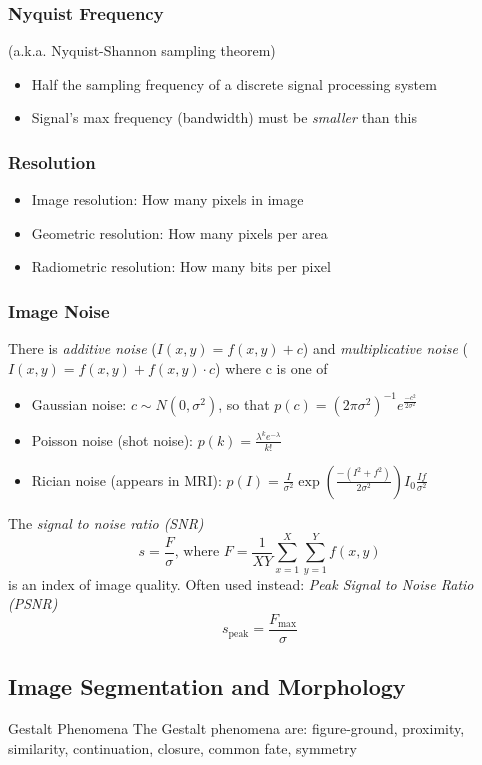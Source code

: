 \documentclass[a4paper,10pt]{article}
\begin{document}
\subsubsection{Nyquist Frequency}
(a.k.a. Nyquist-Shannon sampling theorem)
\begin{itemize}
    \item Half the sampling frequency of a discrete signal processing system
    \item Signal's max frequency (bandwidth) must be \emph{smaller} than this
\end{itemize}

\subsubsection{Resolution}
\begin{itemize}
    \item Image resolution: How many pixels in image
    \item Geometric resolution: How many pixels per area
    \item Radiometric resolution: How many bits per pixel
\end{itemize}

\subsubsection{Image Noise}
There is \emph{additive noise} (\(I(x, y) = f(x, y) + c\)) and \emph{multiplicative noise} (\(I(x, y) = f(x, y) + f(x, y) \cdot c\)) where c is one of
\begin{itemize}
    \item Gaussian noise: \(c \sim N(0, \sigma^2)\), so that \(p(c) = (2 \pi \sigma^2)^{-1} e^\frac{-c^2}{2 \sigma^2}\)
    \item Poisson noise (shot noise): \(p(k) = \frac{\lambda^k e^{-\lambda}}{k!}\)
    \item Rician noise (appears in MRI): \(p(I) = \frac{I}{\sigma^2} \exp{\left(\frac{-(I^2 + f^2)}{2 \sigma^2}\right)} I_0 \frac{If}{\sigma^2}\)
\end{itemize}
The \emph{signal to noise ratio (SNR)} \[s = \frac{F}{\sigma} \text{, where } F = \frac{1}{XY} \sum_{x = 1}^X \sum_{y = 1}^Y f(x, y)\] is an index of image quality. Often used instead: \emph{Peak Signal to Noise Ratio (PSNR)} \[s_\text{peak} = \frac{F_\text{max}}{\sigma}\]

\subsection{Image Segmentation and Morphology}
\begin{subbox}{Gestalt Phenomena}
    The Gestalt phenomena are: figure-ground, proximity, similarity, continuation, closure, common fate, symmetry
\end{subbox}
\end{document}
